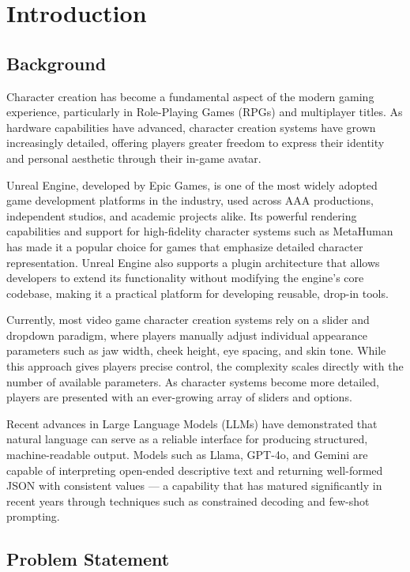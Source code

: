 \chapter{Introduction}
\label{chap:introduction}

\section{Background}
\label{section:background}

Character creation has become a fundamental aspect of the modern gaming experience, particularly in Role-Playing Games (RPGs) and multiplayer titles. As hardware capabilities have advanced, character creation systems have grown increasingly detailed, offering players greater freedom to express their identity and personal aesthetic through their in-game avatar.

Unreal Engine, developed by Epic Games, is one of the most widely adopted game development platforms in the industry, used across AAA productions, independent studios, and academic projects alike. Its powerful rendering capabilities and support for high-fidelity character systems such as MetaHuman has made it a popular choice for games that emphasize detailed character representation. Unreal Engine also supports a plugin architecture that allows developers to extend its functionality without modifying the engine's core codebase, making it a practical platform for developing reusable, drop-in tools.

Currently, most video game character creation systems rely on a slider and dropdown paradigm, where players manually adjust individual appearance parameters such as jaw width, cheek height, eye spacing, and skin tone. While this approach gives players precise control, the complexity scales directly with the number of available parameters. As character systems become more detailed, players are presented with an ever-growing array of sliders and options.

Recent advances in Large Language Models (LLMs) have demonstrated that natural language can serve as a reliable interface for producing structured, machine-readable output. Models such as Llama, GPT-4o, and Gemini are capable of interpreting open-ended descriptive text and returning well-formed JSON with consistent values — a capability that has matured significantly in recent years through techniques such as constrained decoding and few-shot prompting.

\section{Problem Statement}
\label{section:problem-statement}

